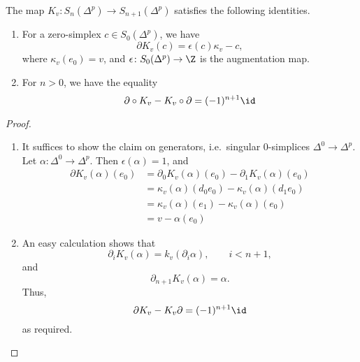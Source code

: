 \documentclass[main.tex]{subfiles}
\begin{document}
\begin{lemma}
  \label{lemma:cone_map_identities}
  The map \(K_{v}\colon S_{n}(\Delta^{p}) \to S_{n+1}(\Delta^{p})\) satisfies the following identities.
  \begin{enumerate}
    \item For a zero-simplex \(c \in S_{0}(\Delta^{p})\), we have
      \begin{equation*}
        \partial K_{v}(c) = \epsilon(c)\kappa_{v} - c,
      \end{equation*}
      where \(\kappa_{v}(e_{0}) = v\), and \(\epsilon\colon S_{0}(\Delta^{p}) \to \Z\) is the augmentation map.

    \item For \(n > 0\), we have the equality
      \begin{equation*}
        \partial \circ K_{v} - K_{v} \circ \partial = (-1)^{n+1}\id
      \end{equation*}
  \end{enumerate}
\end{lemma}
\begin{proof}
  \leavevmode
  \begin{enumerate}
    \item It suffices to show the claim on generators, i.e.\ singular \(0\)-simplices \(\Delta^{0} \to \Delta^{p}\). Let \(\alpha\colon \Delta^{0} \to \Delta^{p}\). Then \(\epsilon(\alpha) = 1\), and
      \begin{align*}
        \partial K_{v}(\alpha)(e_{0}) &= \partial_{0} K_{v}(\alpha)(e_{0}) - \partial_{1} K_{v}(\alpha)(e_{0}) \\
        &= \kappa_{v}(\alpha)(d_{0}e_{0}) - \kappa_{v}(\alpha)(d_{1}e_{0}) \\
        &= \kappa_{v}(\alpha)(e_{1}) - \kappa_{v}(\alpha)(e_{0}) \\
        &= v - \alpha(e_{0})
      \end{align*}

    \item An easy calculation shows that
      \begin{equation*}
        \partial_{i} K_{v}(\alpha) = k_{v}(\partial_{i}\alpha),\qquad i < n+1,
      \end{equation*}
      and
      \begin{equation*}
        \partial_{n+1} K_{v}(\alpha) = \alpha.
      \end{equation*}
      Thus,
      \begin{equation*}
        \partial K_{v} - K_{v}\partial = (-1)^{n+1}\id
      \end{equation*}
      as required.
  \end{enumerate}
\end{proof}
\end{document}
